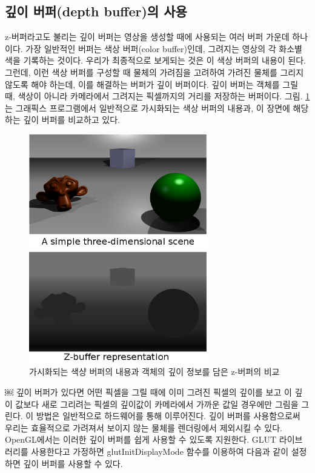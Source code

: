 \subsection{깊이 버퍼(depth buffer)의 사용}

z-버퍼라고도 불리는 깊이 버퍼는 영상을 생성할 때에 사용되는 여러 버퍼 가운데 하나이다. 가장 일반적인 버퍼는 색상 버퍼(color buffer)인데, 그려지는 영상의 각 화소별 색을 기록하는 것이다. 우리가 최종적으로 보게되는 것은 이 색상 버퍼의 내용이 된다. 그런데, 이런 색상 버퍼를 구성할 때 물체의 가려짐을 고려하여 가려진 물체를 그리지 않도록 해야 하는데, 이를 해결하는 버퍼가 깊이 버퍼이다. 깊이 버퍼는 객체를 그릴 때, 색상이 아니라 카메라에서 그려지는 픽셀까지의 거리를 저장하는 버퍼이다. 그림. \ref{fig:OGL_opengl:Z_Buffer}는 그래픽스 프로그램에서 일반적으로 가시화되는 색상 버퍼의 내용과, 이 장면에 해당하는 깊이 버퍼를 비교하고 있다.

\begin{figure}[h!]
  \centering
    \includegraphics[height=10cm]{OGL_opengl/Z_Buffer.png}
    \caption{가시화되는 색샹 버퍼의 내용과 객체의 깊이 정보를 담은 z-버퍼의 비교}
    \label{fig:OGL_opengl:Z_Buffer}
\end{figure}

￼
깊이 버퍼가 있다면 어떤 픽셀을 그릴 때에 이미 그려진 픽셀의 깊이를 보고 이 깊이 값보다 새로 그리려는 픽셀의 깊이값이 카메라에서 가까운 값일 경우에만 그림을 그린다. 이 방법은 일반적으로 하드웨어를 통해 이루어진다.
깊이 버퍼를 사용함으로써 우리는 효율적으로 가려져서 보이지 않는 물체를 렌더링에서 제외시킬 수 있다. 
OpenGL에서는 이러한 깊이 버퍼를 쉽게 사용할 수 있도록 지원한다. GLUT 라이브러리를 사용한다고 가정하면 {\sf glutInitDisplayMode} 함수를 이용하여 다음과 같이 설정하면 깊이 버퍼를 사용할 수 있다.

